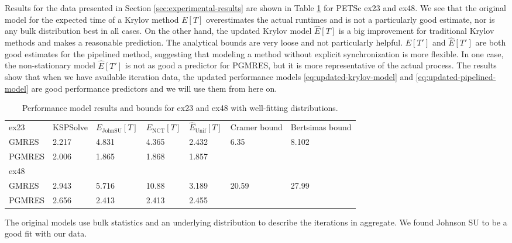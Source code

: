 \documentclass[sigconf]{acmart}
\begin{document}
Results for the data presented in Section \ref{sec:experimental-results} are shown in Table \ref{tab:performance-model} for PETSc ex23 and ex48.
We see that the original model for the expected time of a Krylov method $E[T]$  overestimates the actual runtimes and is not a particularly good estimate, nor is any bulk distribution best in all cases.  On the other hand, the updated Krylov model $\widehat{E}[T]$ is a big improvement for traditional Krylov methods and makes a reasonable prediction. The analytical bounds are very loose and not particularly helpful.
$E[T']$ and $\widehat{E}[T']$ are both good estimates for the pipelined method, suggesting that modeling a method without explicit synchronization is more flexible. 
In one case, the non-stationary model $\widehat{E}[T']$ is not as good a predictor for PGMRES, but it is more representative of the actual process. 
The results show that when we have available iteration data, the updated performance models \eqref{eq:updated-krylov-model} and \eqref{eq:updated-pipelined-model} are good performance predictors and we will use them from here on. 

\begin{table}[t]
\caption{Performance model results and bounds for ex23 and ex48 with well-fitting distributions.}
\begin{center}
\begin{tabular}{| l l l l l  l l |} \hline
 ex23 & KSPSolve & $E_{\text {JohnSU}}\left[T\right]$ & $E_{\text {NCT}}\left[T\right]$ & $\widehat{E}_{\text {Unif}}\left[T\right]$  & Cramer bound & Bertsimas bound \\
 GMRES & 2.217 & 4.831 & 4.365   & 2.432  & 6.35 & 8.102 \\
 PGMRES & 2.006 & 1.865 & 1.868 & 1.857 & &  \\ \hline
 ex48 &  &  &  &  & & \\
 GMRES & 2.943 & 5.716 & 10.88  & 3.189 & 20.59  & 27.99 \\
 PGMRES & 2.656 & 2.413 & 2.413 & 2.455   & & \\
\hline  %
\end{tabular} \label{tab:performance-model}
\end{center}
\end{table}

\iffalse
The original models use bulk statistics and an underlying distribution to describe the iterations in aggregate. We found Johnson SU to be a good fit with our data. 
\end{document}
